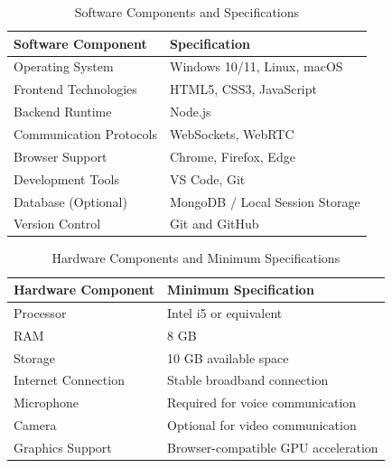 \documentclass[12pt]{article}
\begin{document}
\begin{table}[h!]
\centering
\renewcommand{\arraystretch}{1.5}
\begin{tabular}{|p{6cm}|p{8cm}|}
\hline
\textbf{Software Component} & \textbf{Specification} \\ 
\hline

Operating System & Windows 10/11, Linux, macOS \\ 
\hline

Frontend Technologies & HTML5, CSS3, JavaScript \\ 
\hline

Backend Runtime & Node.js \\ 
\hline

Communication Protocols & WebSockets, WebRTC \\ 
\hline

Browser Support & Chrome, Firefox, Edge \\ 
\hline

Development Tools & VS Code, Git \\ 
\hline

Database (Optional) & MongoDB / Local Session Storage \\ 
\hline

Version Control & Git and GitHub \\ 
\hline

\end{tabular}
\caption{Software Components and Specifications}

\end{table}

\begin{table}[h!]
\centering
\renewcommand{\arraystretch}{1.5}

\begin{tabular}{|p{6cm}|p{8cm}|}
\hline
\textbf{Hardware Component} & \textbf{Minimum Specification} \\ 
\hline

Processor & Intel i5 or equivalent \\ 
\hline

RAM & 8 GB \\ 
\hline

Storage & 10 GB available space \\ 
\hline

Internet Connection & Stable broadband connection \\ 
\hline

Microphone & Required for voice communication \\ 
\hline

Camera & Optional for video communication \\ 
\hline

Graphics Support & Browser-compatible GPU acceleration \\ 
\hline

\end{tabular}
\caption{Hardware Components and Minimum Specifications}
\end{table}
\end{document}
